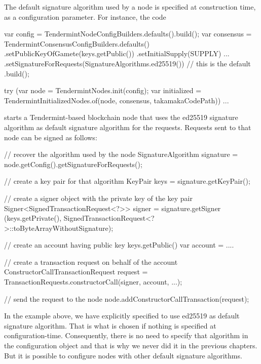 The default signature algorithm used by a node is specified at construction time, as a configuration
parameter. For instance, the code
%
\begin{codebox}\begin{javalst}
var config = TendermintNodeConfigBuilders.defaults().build();
var consensus = TendermintConsensusConfigBuilders.defaults()
  .setPublicKeyOfGamete(keys.getPublic())
  .setInitialSupply(SUPPLY)
  ...
  .setSignatureForRequests(SignatureAlgorithms.ed25519()) // this is the default
  .build();

try (var node = TendermintNodes.init(config);
     var initialized = TendermintInitializedNodes.of(node, consensus, takamakaCodePath)) {
  ...
}
\end{javalst}\end{codebox}
%
starts a Tendermint-based blockchain node that uses the ed25519 signature algorithm
as default signature algorithm for the requests.
Requests sent to that node can be signed as follows:
%
\begin{codebox}\begin{javalst}
// recover the algorithm used by the node
SignatureAlgorithm signature = node.getConfig().getSignatureForRequests();

// create a key pair for that algorithm
KeyPair keys = signature.getKeyPair();

// create a signer object with the private key of the key pair
Signer<SignedTransactionRequest<?>> signer = signature.getSigner
  (keys.getPrivate(), SignedTransactionRequest<?>::toByteArrayWithoutSignature);

// create an account having public key keys.getPublic()
var account = ....

// create a transaction request on behalf of the account
ConstructorCallTransactionRequest request
  = TransactionRequests.constructorCall(signer, account, ...);

// send the request to the node
node.addConstructorCallTransaction(request);
\end{javalst}\end{codebox}
%
In the example above, we have explicitly specified
to use ed25519 as default signature algorithm. That is what is chosen
if nothing is specified at configuration-time.
Consequently, there is no need to specify that algorithm in the
configuration object and that is why we never did it in the previous chapters.
But it is possible to configure nodes with other default signature algorithms.
